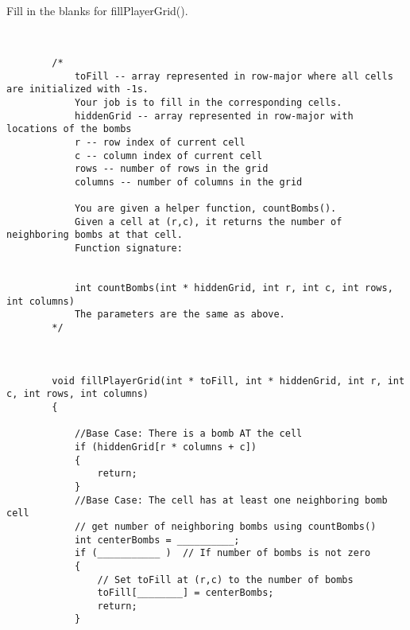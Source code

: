\documentclass{article}
\begin{document}
\begin{enumerate}[label=(\alph*), itemsep = 120pt]
    Fill in the blanks for fillPlayerGrid().


    \begin{lstlisting}[style=CStyle]
        
    
        /*
            toFill -- array represented in row-major where all cells are initialized with -1s. 
            Your job is to fill in the corresponding cells.
            hiddenGrid -- array represented in row-major with locations of the bombs
            r -- row index of current cell
            c -- column index of current cell
            rows -- number of rows in the grid
            columns -- number of columns in the grid
    
            You are given a helper function, countBombs(). 
            Given a cell at (r,c), it returns the number of neighboring bombs at that cell.
            Function signature:


            int countBombs(int * hiddenGrid, int r, int c, int rows, int columns)
            The parameters are the same as above.
        */

        
        
        void fillPlayerGrid(int * toFill, int * hiddenGrid, int r, int c, int rows, int columns) 
        {

            //Base Case: There is a bomb AT the cell
            if (hiddenGrid[r * columns + c])
            {
                return;
            }
            //Base Case: The cell has at least one neighboring bomb cell
            // get number of neighboring bombs using countBombs()
            int centerBombs = __________; 
            if (___________ )  // If number of bombs is not zero
            {
                // Set toFill at (r,c) to the number of bombs
                toFill[________] = centerBombs;
                return;
            }


\end{lstlisting}
\end{enumerate}
\end{document}
